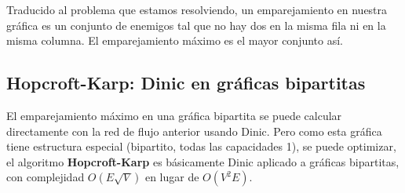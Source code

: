 Traducido al problema que estamos resolviendo, un emparejamiento en nuestra gráfica es un conjunto de enemigos tal que no hay dos en la misma fila ni en la misma columna. El emparejamiento máximo es el mayor conjunto así.
 
\begin{figure}[H]
\centering
{}
\end{figure}

\subsection*{Hopcroft-Karp: Dinic en gráficas bipartitas}
 
El emparejamiento máximo en una gráfica bipartita se puede calcular directamente
con la red de flujo anterior usando Dinic. Pero como esta gráfica tiene
estructura especial (bipartito, todas las capacidades 1), se puede
optimizar, el algoritmo \textbf{Hopcroft-Karp} es básicamente Dinic
aplicado a gráficas bipartitas, con complejidad $O(E\sqrt{V})$ en lugar
de $O(V^2 E)$.
 
